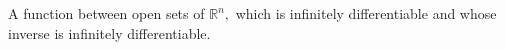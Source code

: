 A function between open sets of $ \mathbb{R} ^n , $ which is
infinitely differentiable and whose inverse is infinitely differentiable.